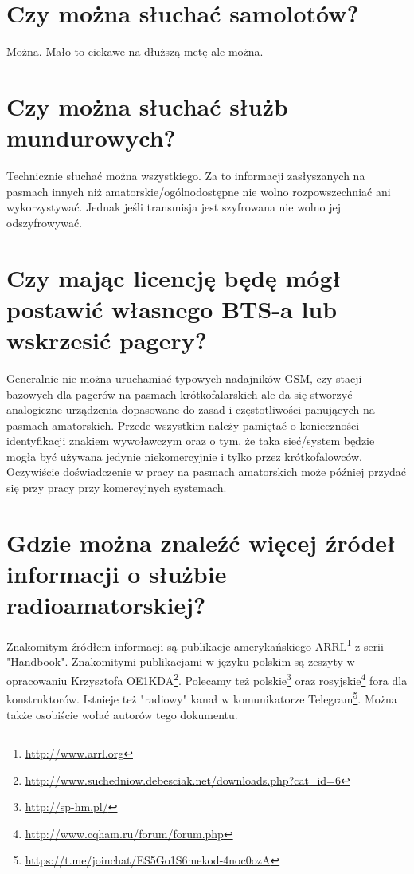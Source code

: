 \documentclass[a4paper,12pt]{article}
\begin{document}
\section{Czy można słuchać samolotów?}
Można. Mało to ciekawe na dłuższą metę ale można.

\section{Czy można słuchać służb mundurowych?}
Technicznie słuchać można wszystkiego. Za to informacji zasłyszanych na pasmach innych niż amatorskie/ogólnodostępne nie wolno rozpowszechniać ani wykorzystywać. Jednak jeśli transmisja jest szyfrowana nie wolno jej odszyfrowywać.

\section{Czy mając licencję będę mógł postawić własnego BTS-a lub wskrzesić pagery?}
Generalnie nie można uruchamiać typowych nadajników GSM, czy stacji bazowych dla pagerów na pasmach krótkofalarskich ale da się stworzyć analogiczne urządzenia dopasowane do zasad i częstotliwości panujących na pasmach amatorskich. Przede wszystkim należy pamiętać o konieczności identyfikacji znakiem wywoławczym oraz o tym, że taka sieć/system będzie mogła być używana jedynie niekomercyjnie i tylko przez krótkofalowców. Oczywiście doświadczenie w pracy na pasmach amatorskich może później przydać się przy pracy przy komercyjnych systemach.

\section{Gdzie można znaleźć więcej źródeł informacji o służbie radioamatorskiej?}
Znakomitym źródłem informacji są publikacje amerykańskiego ARRL\footnote{\url{http://www.arrl.org}} z serii "Handbook". Znakomitymi publikacjami w języku polskim są zeszyty w opracowaniu Krzysztofa OE1KDA\footnote{\url{http://www.suchedniow.debesciak.net/downloads.php?cat_id=6}}. Polecamy też polskie\footnote{\url{http://sp-hm.pl/}} oraz rosyjskie\footnote{\url{http://www.cqham.ru/forum/forum.php}} fora dla konstruktorów. Istnieje też "radiowy" kanał w komunikatorze Telegram\footnote{\url{https://t.me/joinchat/ES5Go1S6mekod-4noc0ozA}}. Można także osobiście wołać autorów tego dokumentu.
\end{document}
